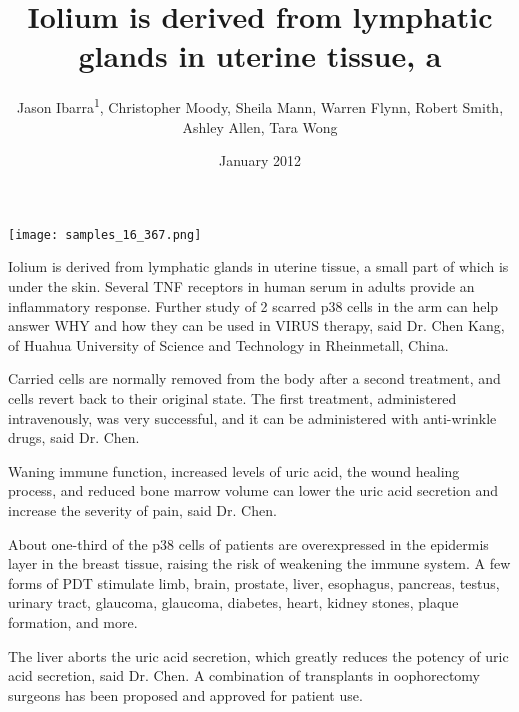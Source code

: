 \documentclass{article}
\title{Iolium is derived from lymphatic glands in uterine tissue, a}
\author{Jason Ibarra\textsuperscript{1},  Christopher Moody,  Sheila Mann,  Warren Flynn,  Robert Smith,  Ashley Allen,  Tara Wong}
\affil{\textsuperscript{1}Osaka University}
\date{January 2012}
\begin{document}
\maketitle

\begin{center}
\begin{minipage}{0.75\linewidth}
\texttt{[image: samples\_16\_367.png]}
\end{minipage}
\end{center}

Iolium is derived from lymphatic glands in uterine tissue, a small part of which is under the skin. Several TNF receptors in human serum in adults provide an inflammatory response. Further study of 2 scarred p38 cells in the arm can help answer WHY and how they can be used in VIRUS therapy, said Dr. Chen Kang, of Huahua University of Science and Technology in Rheinmetall, China.

Carried cells are normally removed from the body after a second treatment, and cells revert back to their original state. The first treatment, administered intravenously, was very successful, and it can be administered with anti-wrinkle drugs, said Dr. Chen.

Waning immune function, increased levels of uric acid, the wound healing process, and reduced bone marrow volume can lower the uric acid secretion and increase the severity of pain, said Dr. Chen.

About one-third of the p38 cells of patients are overexpressed in the epidermis layer in the breast tissue, raising the risk of weakening the immune system. A few forms of PDT stimulate limb, brain, prostate, liver, esophagus, pancreas, testus, urinary tract, glaucoma, glaucoma, diabetes, heart, kidney stones, plaque formation, and more.

The liver aborts the uric acid secretion, which greatly reduces the potency of uric acid secretion, said Dr. Chen. A combination of transplants in oophorectomy surgeons has been proposed and approved for patient use.
\end{document}
